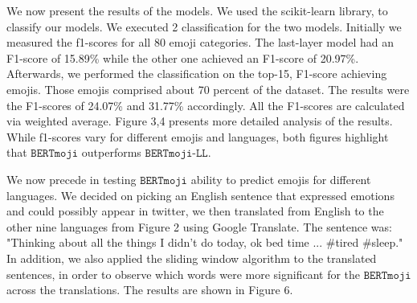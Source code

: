 \documentclass[11pt]{article}
\newcommand{\bertmoji}{\texttt{BERTmoji}}
\newcommand{\bertmojill}{\texttt{BERTmoji-LL}}
\begin{document}
We now present the results of the models. We used the scikit-learn \cite{} library, to classify our models.
We executed 2 classification for the two models. Initially we measured the f1-scores for all 80 emoji categories.
The last-layer model had an F1-score of 15.89\% while the other one achieved an F1-score of 20.97\%. 
Afterwards, we performed the classification on the top-15, F1-score achieving emojis. 
Those emojis comprised about 70 percent of the dataset.
The results were the F1-scores of 24.07\% and 31.77\% accordingly.
All the F1-scores are calculated via weighted average. Figure 3,4 presents more detailed analysis of the results.
While f1-scores vary for different emojis and languages,
both figures highlight that  $\bertmoji$ outperforms $\bertmojill$. 

We now precede in testing $\bertmoji$ ability to predict emojis for different languages.
We decided on picking an English sentence that expressed emotions and could possibly appear in twitter,
we then translated from English to the other nine languages from Figure 2 using Google Translate.
The sentence was: "Thinking about all the things I didn't do today, ok bed time ... \#tired \#sleep."
In addition, we also applied the sliding window algorithm to the translated sentences,
in order to observe which words were more significant for the $\bertmoji$ across the translations.
The results are shown in Figure 6. 
\end{document}
